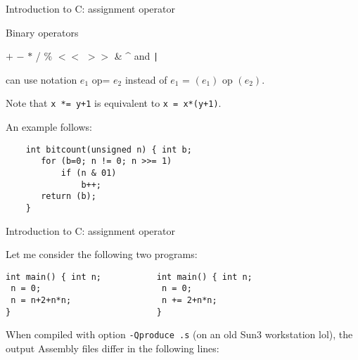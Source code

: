 \begin{frame}[fragile]{Introduction to C: assignment operator}

Binary operators


\vspace{20pt}

\begin{center}
$+$ $-$
$\ast$ / \% $<<$ $>>$ \& \^{} and {\tt |}
\end{center}


\vspace{20pt}

can use notation
$e_1$ op= $e_2$ instead of $e_1$ = $(e_1)$ op $(e_2)$.


\vspace{20pt}

Note that {\tt x *= y+1} is equivalent to {\tt x = x*(y+1)}.



\vspace{20pt}

An example follows:


\vspace{10pt}

\begin{tt}
\begin{verbatim}
    int bitcount(unsigned n) { int b;
       for (b=0; n != 0; n >>= 1)
           if (n & 01)
               b++;
       return (b);
    }
\end{verbatim}
\end{tt}

\end{frame}
\begin{frame}[fragile]{Introduction to C: assignment operator}

Let me consider the following two programs:


\vspace{20pt}

\begin{verbatim}
int main() { int n;           int main() { int n;
 n = 0;                        n = 0;
 n = n+2+n*n;                  n += 2+n*n;
}                             }
\end{verbatim}


\vspace{20pt}

When compiled with option \verb"-Qproduce .s" (on an old Sun3 workstation lol),
the output Assembly files differ in the following lines:

\end{frame}
